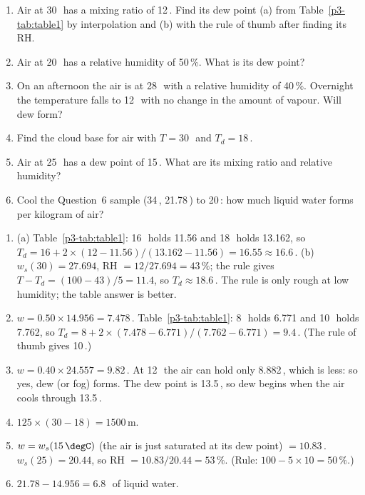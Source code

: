 \begin{tryit}
\begin{enumerate}[label=\textbf{\thechapter.\arabic*},leftmargin=*,itemsep=3pt]
\item Air at 30\,\degC\ has a mixing ratio of 12\,\gkg. Find its dew point (a) from Table~\ref{p3-tab:table1} by interpolation and (b) with the rule of thumb after finding its RH.
\item Air at 20\,\degC\ has a relative humidity of 50\,\%. What is its dew point?
\item On an afternoon the air is at 28\,\degC\ with a relative humidity of 40\,\%. Overnight the temperature falls to 12\,\degC\ with no change in the amount of vapour. Will dew form?
\item Find the cloud base for air with $T=30$\,\degC\ and $T_d=18$\,\degC.
\item Air at 25\,\degC\ has a dew point of 15\,\degC. What are its mixing ratio and relative humidity?
\item Cool the Question~6 sample (34\,\degC, 21.78\,\gkg) to 20\,\degC: how much liquid water forms per kilogram of air?
\end{enumerate}
\end{tryit}

\begin{answerbox}
\begin{enumerate}[label=\textbf{\thechapter.\arabic*},leftmargin=*,itemsep=3pt]
\item (a) Table~\ref{p3-tab:table1}: 16\,\degC\ holds 11.56 and 18\,\degC\ holds 13.162, so $T_d=16+2\times(12-11.56)/(13.162-11.56)=16.55\approx16.6$\,\degC. (b) $w_s(30)=27.694$, RH $=12/27.694=43\,\%$; the rule gives $T-T_d=(100-43)/5=11.4$, so $T_d\approx18.6$\,\degC. The rule is only rough at low humidity; the table answer is better.
\item $w=0.50\times14.956=7.478$\,\gkg. Table~\ref{p3-tab:table1}: 8\,\degC\ holds 6.771 and 10\,\degC\ holds 7.762, so $T_d=8+2\times(7.478-6.771)/(7.762-6.771)=9.4$\,\degC. (The rule of thumb gives 10\,\degC.)
\item $w=0.40\times24.557=9.82$\,\gkg. At 12\,\degC\ the air can hold only 8.882\,\gkg, which is less: so yes, dew (or fog) forms. The dew point is 13.5\,\degC, so dew begins when the air cools through 13.5\,\degC.
\item $125\times(30-18)=1500$\,m.
\item $w=w_s(15\,\degC)$ (the air is just saturated at its dew point) $=10.83$\,\gkg. $w_s(25)=20.44$, so RH $=10.83/20.44=53\,\%$. (Rule: $100-5\times10=50\,\%$.)
\item $21.78-14.956=6.8$\,\gkg\ of liquid water.
\end{enumerate}
\end{answerbox}


